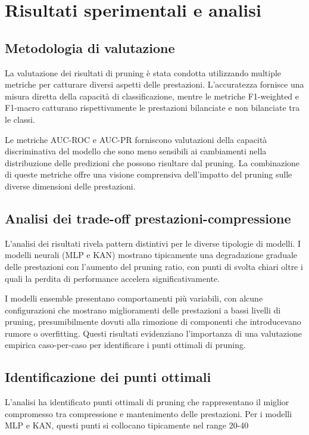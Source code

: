 \documentclass[a4paper,12pt]{report}
\begin{document}
	\section{Risultati sperimentali e analisi}
	
	\subsection{Metodologia di valutazione}
	La valutazione dei risultati di pruning è stata condotta utilizzando multiple metriche per catturare diversi aspetti delle prestazioni. L'accuratezza fornisce una misura diretta della capacità di classificazione, mentre le metriche F1-weighted e F1-macro catturano rispettivamente le prestazioni bilanciate e non bilanciate tra le classi.
	
	Le metriche AUC-ROC e AUC-PR forniscono valutazioni della capacità discriminativa del modello che sono meno sensibili ai cambiamenti nella distribuzione delle predizioni che possono risultare dal pruning. La combinazione di queste metriche offre una visione comprensiva dell'impatto del pruning sulle diverse dimensioni delle prestazioni.
	
	\subsection{Analisi dei trade-off prestazioni-compressione}
	L'analisi dei risultati rivela pattern distintivi per le diverse tipologie di modelli. I modelli neurali (MLP e KAN) mostrano tipicamente una degradazione graduale delle prestazioni con l'aumento del pruning ratio, con punti di svolta chiari oltre i quali la perdita di performance accelera significativamente.
	
	I modelli ensemble presentano comportamenti più variabili, con alcune configurazioni che mostrano miglioramenti delle prestazioni a bassi livelli di pruning, presumibilmente dovuti alla rimozione di componenti che introducevano rumore o overfitting. Questi risultati evidenziano l'importanza di una valutazione empirica caso-per-caso per identificare i punti ottimali di pruning.
	
	\subsection{Identificazione dei punti ottimali}
	L'analisi ha identificato punti ottimali di pruning che rappresentano il miglior compromesso tra compressione e mantenimento delle prestazioni. Per i modelli MLP e KAN, questi punti si collocano tipicamente nel range 20-40%
	
\end{document}

